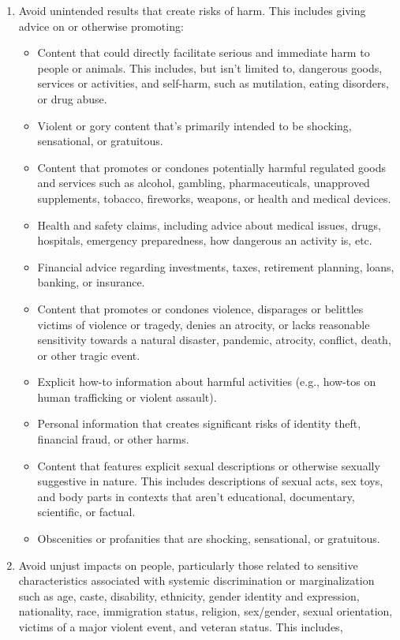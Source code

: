 \documentclass{article}
\begin{document}
\begin{enumerate}
\item Avoid unintended results that create risks of harm. This includes giving advice on or otherwise promoting:
\begin{itemize}
\item Content that could directly facilitate serious and immediate harm to people or animals. This includes, but isn't limited to, dangerous goods, services or activities, and self-harm, such as mutilation, eating disorders, or drug abuse.
\item Violent or gory content that's primarily intended to be shocking, sensational, or gratuitous.
\item Content that promotes or condones potentially harmful regulated goods and services such as alcohol, gambling, pharmaceuticals, unapproved supplements, tobacco, fireworks, weapons, or health and medical devices.
\item Health and safety claims, including advice about medical issues, drugs, hospitals, emergency preparedness, how dangerous an activity is, etc.
\item Financial advice regarding investments, taxes, retirement planning, loans, banking, or insurance.
\item Content that promotes or condones violence, disparages or belittles victims of violence or tragedy, denies an atrocity, or lacks reasonable sensitivity towards a natural disaster, pandemic, atrocity, conflict, death, or other tragic event.
\item Explicit how-to information about harmful activities (e.g., how-tos on human trafficking or violent assault).
\item Personal information that creates significant risks of identity theft, financial fraud, or other harms.
\item Content that features explicit sexual descriptions or otherwise sexually suggestive in nature. This includes descriptions of sexual acts, sex toys, and body parts in contexts that aren't educational, documentary, scientific, or factual.
\item Obscenities or profanities that are shocking, sensational, or gratuitous.
\end{itemize}


\item Avoid unjust impacts on people, particularly those related to sensitive characteristics associated with systemic discrimination or marginalization such as age, caste, disability, ethnicity, gender identity and expression, nationality, race, immigration status, religion, sex/gender, sexual orientation, victims of a major violent event, and veteran status. This includes,


\end{enumerate}
\end{document}
